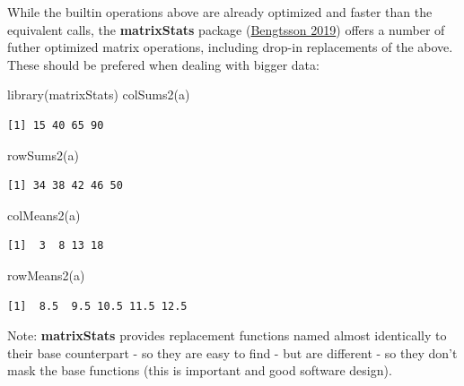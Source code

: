 \documentclass[
]{book}
\newenvironment{Shaded}{\begin{snugshade}}{\end{snugshade}}
\newcommand{\FunctionTok}[1]{\textcolor[rgb]{0.00,0.00,0.00}{#1}}
\newcommand{\NormalTok}[1]{#1}
\begin{document}
While the builtin operations above are already optimized and faster than the equivalent calls, the \textbf{matrixStats} package (\protect\hyperlink{ref-matrixStats2019}{Bengtsson 2019}) offers a number of futher optimized matrix operations, including drop-in replacements of the above. These should be prefered when dealing with bigger data:

\begin{Shaded}
\begin{Highlighting}[]
\FunctionTok{library}\NormalTok{(matrixStats)}
\FunctionTok{colSums2}\NormalTok{(a)}
\end{Highlighting}
\end{Shaded}

\begin{verbatim}
[1] 15 40 65 90
\end{verbatim}

\begin{Shaded}
\begin{Highlighting}[]
\FunctionTok{rowSums2}\NormalTok{(a)}
\end{Highlighting}
\end{Shaded}

\begin{verbatim}
[1] 34 38 42 46 50
\end{verbatim}

\begin{Shaded}
\begin{Highlighting}[]
\FunctionTok{colMeans2}\NormalTok{(a)}
\end{Highlighting}
\end{Shaded}

\begin{verbatim}
[1]  3  8 13 18
\end{verbatim}

\begin{Shaded}
\begin{Highlighting}[]
\FunctionTok{rowMeans2}\NormalTok{(a)}
\end{Highlighting}
\end{Shaded}

\begin{verbatim}
[1]  8.5  9.5 10.5 11.5 12.5
\end{verbatim}

Note: \textbf{matrixStats} provides replacement functions named almost identically to their base counterpart - so they are easy to find - but are different - so they don't mask the base functions (this is important and good software design).
\end{document}
